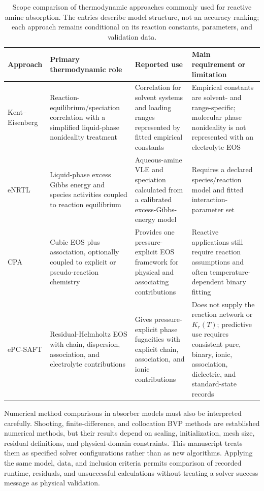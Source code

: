         \begin{table}
            \centering
            \small
            \caption{Scope comparison of thermodynamic approaches commonly used for reactive amine absorption. The entries describe model structure, not an accuracy ranking; each approach remains conditional on its reaction constants, parameters, and validation data.}
            \label{tab:thermodynamic-model-comparison}
            \begin{tabularx}{\textwidth}{>{\raggedright\arraybackslash}p{2.5cm}XXX}
                \toprule
                \textbf{Approach} & \textbf{Primary thermodynamic role} & \textbf{Reported use} & \textbf{Main requirement or limitation} \\
                \midrule
                Kent--Eisenberg & Reaction-equilibrium/speciation correlation with a simplified liquid-phase nonideality treatment & Correlation for solvent systems and loading ranges represented by fitted empirical constants \cite{Shahid2019,Zhu2022} & Empirical constants are solvent- and range-specific; molecular phase nonideality is not represented with an electrolyte EOS \\
                eNRTL & Liquid-phase excess Gibbs energy and species activities coupled to reaction equilibrium & Aqueous-amine VLE and speciation calculated from a calibrated excess-Gibbs-energy model \cite{Zhang2011} & Requires a declared species/reaction model and fitted interaction-parameter set \\
                CPA & Cubic EOS plus association, optionally coupled to explicit or pseudo-reaction chemistry & Provides one pressure-explicit EOS framework for physical and associating contributions \cite{Chen2023} & Reactive applications still require reaction assumptions and often temperature-dependent binary fitting \\
                ePC-SAFT & Residual-Helmholtz EOS with chain, dispersion, association, and electrolyte contributions & Gives pressure-explicit phase fugacities with explicit chain, association, and ionic contributions \cite{Cameretti2005,Bulow2021a} & Does not supply the reaction network or $K_r(T)$; predictive use requires consistent pure, binary, ionic, association, dielectric, and standard-state records \\
                \bottomrule
            \end{tabularx}
        \end{table}

        Numerical method comparisons in absorber models must also be interpreted carefully. Shooting, finite-difference, and collocation BVP methods are established numerical methods, but their results depend on scaling, initialization, mesh size, residual definitions, and physical-domain constraints. This manuscript treats them as specified solver configurations rather than as new algorithms. Applying the same model, data, and inclusion criteria permits comparison of recorded runtime, residuals, and unsuccessful calculations without treating a solver success message as physical validation.

